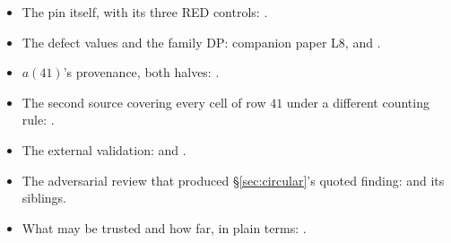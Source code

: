 \documentclass[11pt]{article}
\begin{document}
\begin{itemize}
\item The pin itself, with its three RED controls:
.
\item The defect values and the family DP: companion paper L8, and
.
\item $a(41)$'s provenance, both halves: .
\item The second source covering every cell of row $41$ under a different
counting rule: .
\item The external validation:  and
.
\item The adversarial review that produced \S\ref{sec:circular}'s quoted
finding:  and its siblings.
\item What may be trusted and how far, in plain terms:
.
\end{itemize}



\end{document}

